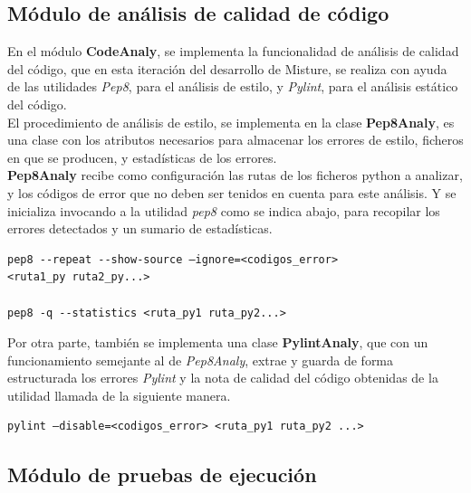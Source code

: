 \subsection{Módulo de análisis de calidad de código}

En el módulo \textbf{CodeAnaly}, se implementa la funcionalidad de análisis de calidad del código, que en esta iteración del desarrollo de Misture, se realiza con ayuda de las utilidades \textit{Pep8}, para el análisis de estilo, y \textit{Pylint}, para el análisis estático del código.\\


El procedimiento de análisis de estilo, se implementa en la clase \textbf{Pep8Analy}, es una clase con los atributos necesarios para almacenar los errores de estilo, ficheros en que se producen, y estadísticas de los errores.\\


\textbf{Pep8Analy}  recibe como configuración las rutas de los ficheros python a analizar, y los códigos de error que no deben ser tenidos en cuenta para este análisis. Y se inicializa invocando a la utilidad \textit{pep8} como se indica abajo, para recopilar los errores detectados y un sumario de estadísticas.\\

\begin{center}
\begin{verbatim}
pep8 --repeat --show-source –ignore=<codigos_error>
<ruta1_py ruta2_py...>

pep8 -q --statistics <ruta_py1 ruta_py2...>
\end{verbatim}
\end{center}


Por otra parte, también se implementa una clase \textbf{PylintAnaly}, que con un funcionamiento semejante al de \textit{Pep8Analy}, extrae y guarda de forma estructurada los errores \textit{Pylint} y la nota de calidad del código obtenidas de la utilidad llamada de la siguiente manera.\\

\begin{center}
\begin{verbatim}
pylint –disable=<codigos_error> <ruta_py1 ruta_py2 ...>
\end{verbatim}
\end{center}


\subsection{Módulo de pruebas de ejecución}

